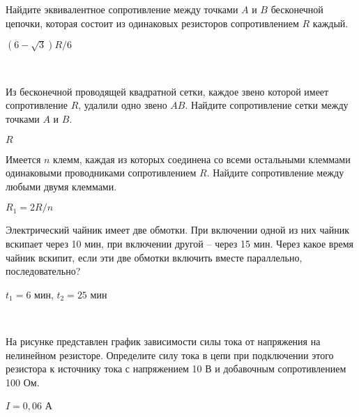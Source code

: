 \begin{ex}
Найдите эквивалентное сопротивление между точками $A$ и $B$ бесконечной цепочки, которая состоит из одинаковых резисторов сопротивлением $R$ каждый.

\centering

\begin{ans}
$(6-\sqrt{3})R/6$
\end{ans}
\end{ex}

\begin{ex}
\hspace{0pt} \\
\begin{minipage}{.65\textwidth}
Из бесконечной проводящей квадратной сетки, каждое звено которой имеет сопротивление $R$, удалили одно звено $AB$. Найдите сопротивление сетки между точками $A$ и $B$.
\end{minipage}
\begin{minipage}{.35\textwidth}
\centering

\end{minipage}
\begin{ans}
$R$
\end{ans}
\end{ex}

\begin{ex}
Имеется $n$ клемм, каждая из которых соединена со всеми остальными клеммами одинаковыми проводниками сопротивлением $R$. Найдите сопротивление между любыми двумя клеммами.
\begin{ans}
$R_1 = 2R/n$
\end{ans}
\end{ex}

\begin{ex}
Электрический чайник имеет две обмотки. При включении одной из них чайник вскипает через 10 мин, при включении другой -- через 15 мин. 
Через какое время чайник вскипит, если эти две обмотки включить вместе параллельно, последовательно?
\begin{ans}
$t_1 = 6$ мин, $t_2 = 25$ мин
\end{ans}
\end{ex}

\begin{samepage}
\begin{ex}
\hspace{0pt} \\
\begin{minipage}{.65\textwidth}
На рисунке представлен график зависимости силы тока от напряжения на нелинейном резисторе. 
Определите силу тока в цепи при подключении этого резистора к источнику тока с напряжением 10 В и добавочным сопротивлением 100 Ом.
\end{minipage}
\begin{minipage}{.35\textwidth}
\centering

\end{minipage}
\begin{ans}
$I = 0,06$ А
\end{ans}
\end{ex}
\end{samepage}


